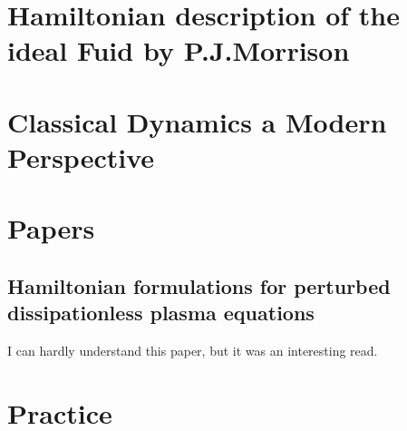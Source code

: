 \section{Hamiltonian description of the ideal Fuid by
 P.J.Morrison}
 \section{Classical Dynamics a Modern Perspective}
 \par 
\section{Papers}
\subsection{Hamiltonian formulations for perturbed dissipationless plasma equations}
\par I can hardly understand this paper, but it was an interesting read.
\section{Practice}




